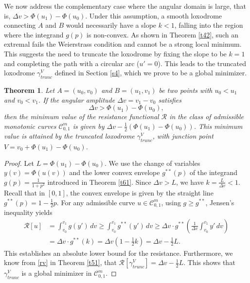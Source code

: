 \documentclass[a4paper,12pt]{amsart}
\newtheorem{theorem}{Theorem}[section]
\theoremstyle{definition}
\begin{document}
 
We now address the complementary case where the angular domain is large, that is, 
$\Delta v > \Phi(u_1) - \Phi(u_0)$. Under  this assumption,  a smooth loxodrome connecting 
$A$ and $B$ would necessarily have a slope $k<1$, falling into the region where the integrand 
$g(p)$ is non-convex. As shown in  Theorem \ref{t42}, such an extremal fails the Weierstrass 
condition and cannot be a strong  local minimum. This suggests  the need to truncate the loxodrome  by fixing the slope to be $k=1$ and completing the path with a circular arc ($u'=0$). This leads to   the 
truncated loxodrome $\gamma_{trunc}^V$ defined in Section \ref{s4}, which we prove to be  a global minimizer.  

\begin{theorem}\label{t62}
Let $A=(u_0, v_0)$ and $B=(u_1, v_1)$ be two points with $u_0 < u_1$ and $v_0<v_1$. If the angular amplitude $\Delta v = v_1 - v_0$ satisfies 
\begin{equation}
\Delta v > \Phi(u_1) - \Phi(u_0),
\end{equation}
then the  minimum value of the resistance functional $\mathcal{R}$ in the class of admissible monotonic curves $\mathcal{C}_{0,1}^{m}$ is given by $\Delta v - \frac{1}{2}(\Phi(u_1) - \Phi(u_0))$. This minimum value is attained by the truncated loxodrome $\gamma_{trunc}^V$, with junction point $V = v_0 + \Phi(u_1) - \Phi(u_0)$.
\end{theorem}

\begin{proof}
Let $L = \Phi(u_1) - \Phi(u_0)$. We use the change of variables $y(v) = \Phi(u(v))$ and the lower convex envelope $g^{**}(p)$ of the integrand $g(p) = \frac{1}{1+p^2}$ introduced in Theorem \ref{t61}. Since $\Delta v > L$, we have $k = \frac{L}{\Delta v} < 1$. 
Recall that in  $[0, 1]$, the convex envelope is given by the straight line $g^{**}(p) = 1 - \frac{1}{2}p$. For any admissible curve $u \in \mathcal{C}_{0,1}^m$, using $g\geq g^{**}$, Jensen's inequality yields
\begin{equation}
\begin{split}
\mathcal{R}[u] &= \int_{v_0}^{v_1} g(y')\,dv \ge \int_{v_0}^{v_1} g^{**}(y')\, dv \ge \Delta v \cdot g^{**}\left( \frac{1}{\Delta v} \int_{v_0}^{v_1} y'\, dv \right) \\
&= \Delta v \cdot g^{**}(k) = \Delta v \left( 1 - \frac{1}{2}k \right) = \Delta v - \frac{1}{2}L.
\end{split}
\end{equation}
This establishes an absolute lower bound for the resistance. Furthermore, we know from \eqref{rv} in Theorem \ref{t51}, that $
\mathcal{R}[\gamma_{trunc}^V] =  \Delta v - \frac{1}{2}L$. This shows that  $\gamma_{trunc}^V$  is a global minimizer in $\mathcal{C}_{0,1}^m$. 
\end{proof}
\end{document}
